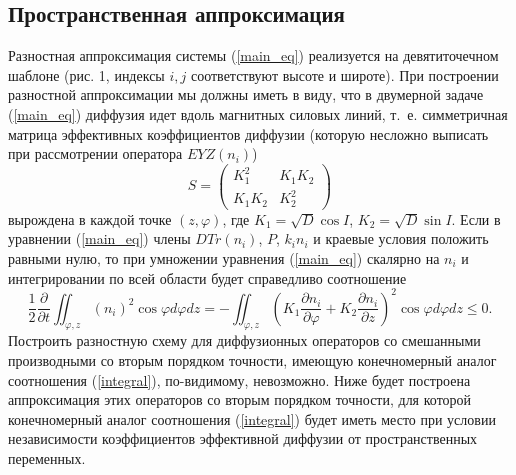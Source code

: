\documentclass[14pt, a4paper]{extarticle}
\renewcommand{\leq}{\leqslant}
\begin{document}
\subsection{Пространственная аппроксимация}
Разностная аппроксимация системы (\ref{main_eq}) реализуется на девятиточечном шаблоне (рис. 1, индексы $i, j$ соответствуют высоте и широте). При построении разностной аппроксимации мы должны иметь в виду, что в двумерной задаче (\ref{main_eq}) диффузия идет вдоль магнитных силовых линий, т.~е. симметричная матрица эффективных коэффициентов диффузии (которую несложно выписать при рассмотрении оператора $EYZ(n_i)$) \begin{equation} S = \begin{pmatrix}K_1^2 & K_1K_2 \\
K_1K_2 & K_2^2 \end{pmatrix}\end{equation} вырождена в каждой точке $(z, \varphi)$, где $K_1 = \sqrt{D}\cos I$, $K_2 = \sqrt{D}\sin I$. Если в уравнении (\ref{main_eq}) члены $DTr(n_i)$, $P$, $k_in_i$ и краевые условия положить равными нулю, то при умножении уравнения (\ref{main_eq}) скалярно на $n_i$ и интегрировании по всей области будет справедливо соотношение
\begin{equation}
\dfrac{1}{2}\dfrac{\partial}{\partial t} \iint_{\varphi, z} (n_i)^2 \cos\varphi d\varphi dz = - \iint_{\varphi, z}\left(K_1 \dfrac{\partial n_i}{\partial\varphi} + K_2\dfrac{\partial n_i}{\partial z}\right)^2 \cos \varphi d\varphi dz \leq 0.
\label{integral}
\end{equation}
Построить разностную схему для диффузионных операторов со смешанными производными со вторым порядком точности, имеющую конечномерный  аналог  соотношения (\ref{integral}), по-видимому, невозможно. Ниже будет построена аппроксимация этих операторов со вторым порядком точности, для которой конечномерный аналог соотношения (\ref{integral}) будет иметь место при условии независимости коэффициентов эффективной диффузии от пространственных переменных.
\end{document}

